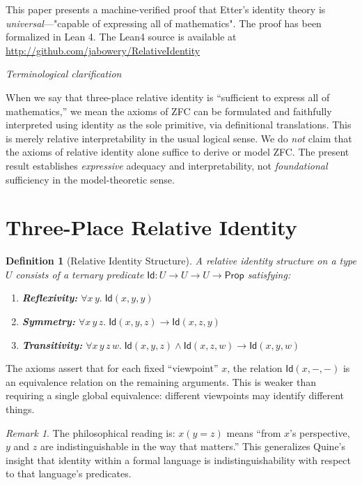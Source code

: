 \documentclass[11pt, a4paper]{article}
\newtheorem{definition}[theorem]{Definition}
\theoremstyle{remark}
\newtheorem{remark}[theorem]{Remark}
\newcommand{\Id}{\mathsf{Id}}
\begin{document}
This paper presents a machine-verified proof that Etter's identity theory is \emph{universal}---"capable of expressing all of mathematics". The proof has been formalized in Lean 4.  The Lean4 source is available at \url{http://github.com/jabowery/RelativeIdentity}

\emph{Terminological clarification}

When we say that three-place relative identity is “sufficient to express all of mathematics,” we mean the axioms of ZFC can be formulated and faithfully interpreted using identity as the sole primitive, via definitional translations. This is merely relative interpretability in the usual logical sense. We do \emph{not} claim that the axioms of relative identity alone suffice to derive or model ZFC. The present result establishes \emph{expressive} adequacy and interpretability, not \emph{foundational} sufficiency in the model-theoretic sense.

\section{Three-Place Relative Identity}

\begin{definition}[Relative Identity Structure]
A \emph{relative identity structure} on a type $U$ consists of a ternary predicate $\Id : U \to U \to U \to \mathsf{Prop}$ satisfying:
\begin{enumerate}[label=(\roman*)]
    \item \textbf{Reflexivity:} $\forall x\, y.\; \Id(x, y, y)$
    \item \textbf{Symmetry:} $\forall x\, y\, z.\; \Id(x, y, z) \to \Id(x, z, y)$
    \item \textbf{Transitivity:} $\forall x\, y\, z\, w.\; \Id(x, y, z) \land \Id(x, z, w) \to \Id(x, y, w)$
\end{enumerate}
\end{definition}

The axioms assert that for each fixed ``viewpoint'' $x$, the relation $\Id(x, -, -)$ is an equivalence relation on the remaining arguments. This is weaker than requiring a single global equivalence: different viewpoints may identify different things.

\begin{remark}
The philosophical reading is: $x(y = z)$ means ``from $x$'s perspective, $y$ and $z$ are indistinguishable in the way that matters.'' This generalizes Quine's insight that identity within a formal language is indistinguishability with respect to that language's predicates.
\end{remark}
\end{document}
